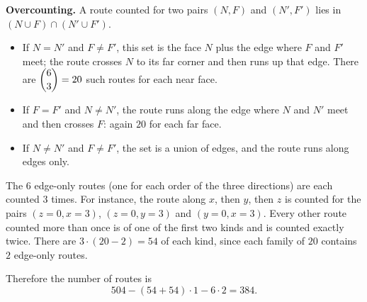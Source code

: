 \textbf{Overcounting.} A route counted for two pairs $(N,F)$ and $(N',F')$ lies in $(N\cup F)\cap(N'\cup F')$.
\begin{itemize}
\item If $N=N'$ and $F\ne F'$, this set is the face $N$ plus the edge where $F$ and $F'$ meet; the route crosses $N$ to its far corner and then runs up that edge. There are $\dbinom63=20$ such routes for each near face.
\item If $F=F'$ and $N\ne N'$, the route runs along the edge where $N$ and $N'$ meet and then crosses $F$: again $20$ for each far face.
\item If $N\ne N'$ and $F\ne F'$, the set is a union of edges, and the route runs along edges only.
\end{itemize}
The $6$ edge-only routes (one for each order of the three directions) are each counted $3$ times. For instance, the route along $x$, then $y$, then $z$ is counted for the pairs $(z=0,x=3)$, $(z=0,y=3)$ and $(y=0,x=3)$. Every other route counted more than once is of one of the first two kinds and is counted exactly twice. There are $3\cdot(20-2)=54$ of each kind, since each family of $20$ contains $2$ edge-only routes.

Therefore the number of routes is
\[
504-(54+54)\cdot1-6\cdot2=\boxed{384}.
\]
